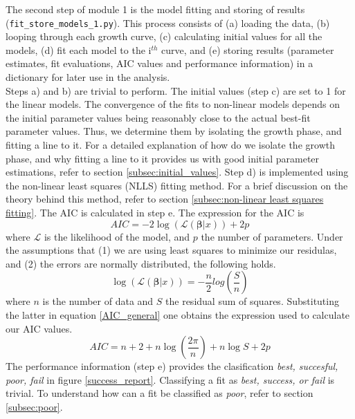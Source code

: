 \documentclass[titlepage,11pt]{article}
\begin{document}
\begin{linenumbers}
	The second step of module 1 is the model fitting and storing of results (\verb|fit_store_models_1.py|). This process consists of (a) loading the data, (b) looping through each growth curve, (c) calculating initial values for all the models, (d) fit each model to the i$ ^{th} $ curve, and (e) storing results (parameter estimates, fit evaluations, AIC values and performance information) in a dictionary for later use in the analysis. \\
	Steps a) and b) are trivial to perform. The initial values (step c) are set to 1 for the linear models. The convergence of the fits to non-linear models depends on the initial parameter values being reasonably close to the actual best-fit parameter values. Thus, we determine them by isolating the growth phase, and fitting a line to it. For a detailed explanation of how do we isolate the growth phase, and why fitting a line to it provides us with good initial parameter estimations, refer to section \ref{subsec:initial_values}. Step d) is implemented using the non-linear least squares (NLLS) fitting method. For a brief discussion on the theory behind this method, refer to section \ref{subsec:non-linear least squares fitting}. The AIC is calculated in step e. The expression for the AIC is
	\begin{equation}
		AIC = -2\log\left(\mathcal{L}(\boldsymbol{\beta}|x)\right) + 2p
		\label{AIC_general}
	\end{equation}
 	where $ \mathcal{L} $ is the likelihood of the model, and $ p $ the number of parameters. Under the assumptions that (1) we are using least squares to minimize our residulas, and (2) the errors are normally distributed, the following holds.
 	\begin{equation}
 		\log\left(\mathcal{L}(\boldsymbol{\beta}|x)\right) = -\frac{n}{2}log\left(\frac{S}{n}\right) 
 	\end{equation}
 	where $ n $ is the number of data and $ S $ the residual sum of squares. Substituting the latter in equation \ref{AIC_general} one obtains the expression used to calculate our AIC values. \\
 	\begin{equation}
 	AIC = n + 2 + n \log\left(\frac{2\pi}{n}\right) + n\log S + 2 p
 	\end{equation}
 	The performance information (step e) provides the clasification \textit{best, succesful, poor, fail} in figure \ref{success_report}.  Classifying a fit as \textit{best, success, or fail} is trivial. To understand how can a fit be classified as \textit{poor}, refer to section \ref{subsec:poor}.\\
 	

\end{linenumbers}
\end{document}

